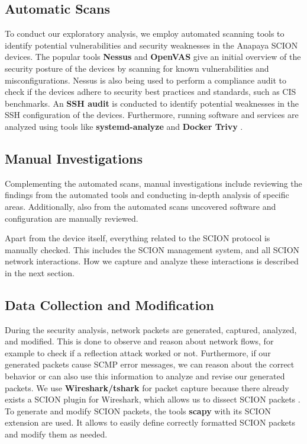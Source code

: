 \subsection{Automatic Scans}
To conduct our exploratory analysis, we employ automated scanning tools to identify potential vulnerabilities and security weaknesses in the Anapaya SCION devices.
The popular tools \textbf{Nessus} and \textbf{OpenVAS} give an initial overview of the security posture of the devices by scanning for known vulnerabilities and misconfigurations.
Nessus is also being used to perform a compliance audit to check if the devices adhere to security best practices and standards, such as CIS benchmarks.
An \textbf{SSH audit} is conducted to identify potential weaknesses in the SSH configuration of the devices.
Furthermore, running software and services are analyzed using tools like \textbf{systemd-analyze} \cite{systemdAnalyze} and \textbf{Docker Trivy} \cite{trivy}.


\subsection{Manual Investigations}
Complementing the automated scans, manual investigations include reviewing the findings from the automated tools and conducting in-depth analysis of specific areas.
Additionally, also from the automated scans uncovered software and configuration are manually reviewed.

Apart from the device itself, everything related to the SCION protocol is manually checked.
This includes the SCION management system, and all SCION network interactions.
How we capture and analyze these interactions is described in the next section.


\subsection{Data Collection and Modification}
During the security analysis, network packets are generated, captured, analyzed, and modified.
This is done to observe and reason about network flows, for example to check if a reflection attack worked or not.
Furthermore, if our generated packets cause SCMP error messages, we can reason about the correct behavior or can also use this information to analyze and revise our generated packets.
We use \textbf{Wireshark/tshark} \cite{wireshark} for packet capture because there already exists a SCION plugin for Wireshark, which allows us to dissect SCION packets \cite{wiresharkSCION}.
To generate and modify SCION packets, the tools \textbf{scapy} \cite{scapy} with its SCION extension \cite{scapySCION} are used.
It allows to easily define correctly formatted SCION packets and modify them as needed.



